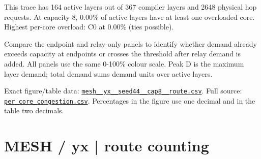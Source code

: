 \documentclass[10pt,a4paper]{article}
\begin{document}
This trace has 164 active layers out of 367 compiler layers and 2648 physical hop requests. At capacity 8, 0.00\% of active layers have at least one overloaded core. Highest per-core overload: C0 at 0.00\% (ties possible).\par
Compare the endpoint and relay-only panels to identify whether demand already exceeds capacity at endpoints or crosses the threshold after relay demand is added. All panels use the same 0-100\% colour scale. Peak D is the maximum layer demand; total demand sums demand units over active layers.\par
Exact figure/table data: \href{\detokenize{file:///home/dhruv-pansuriya/Documents/BTP/Compiler-Driven-ACE/output/pdf/qaoa_methods_congestion/tables/mesh__yx__seed44__cap8__route.csv}}{\nolinkurl{mesh__yx__seed44__cap8__route.csv}}. Full source: \href{\detokenize{file:///home/dhruv-pansuriya/Documents/BTP/Compiler-Driven-ACE/results/qaoa_2seed_2026-10-26/congestion/per_core_congestion.csv}}{\nolinkurl{per_core_congestion.csv}}. Percentages in the figure use one decimal and in the table two decimals.\par
\clearpage
\section*{MESH / yx | route counting}
\end{document}

